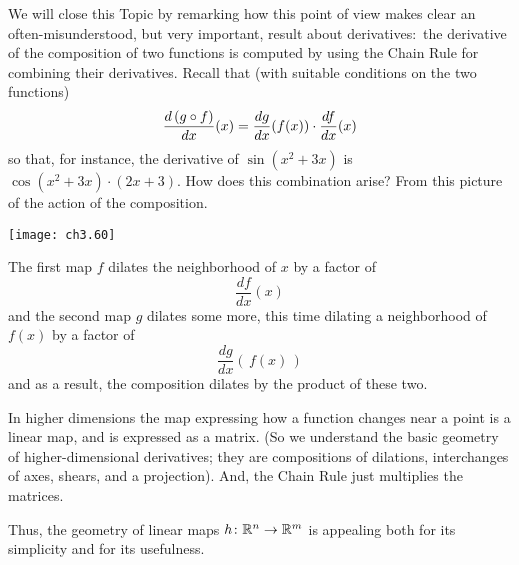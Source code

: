 We will close this Topic by remarking how
this point of view makes clear an often-misunderstood, but very important, 
result about derivatives:~the derivative of the composition of two functions
is computed by using the Chain Rule for combining their derivatives.
Recall that (with suitable conditions on the two functions)
\begin{equation*}
  \frac{d\,(g\mathbin\circ f)}{dx}(x) = 
  \frac{dg}{dx}(f(x))\cdot\frac{df}{dx}(x)
\end{equation*} 
so that, for instance, the derivative of $\sin(x^2+3x)$ is
$\cos(x^2+3x)\cdot(2x+3)$.
How does this combination arise?
From this picture of the action of the composition.  
\begin{center}
  \texttt{[image: ch3.60]}
\end{center}
The first map $f$ dilates the neighborhood of $x$ by a factor of 
\begin{equation*}
  \frac{df}{dx}(x) 
\end{equation*}
and the second map $g$ dilates some more, this time 
dilating a neighborhood of $f(x)$ by a factor of 
\begin{equation*}
  \frac{dg}{dx}(\,f(x)\,) 
\end{equation*}
and as a result, the composition dilates by the product of these two.

In higher dimensions 
the map expressing how a function changes near a point is a linear map,
and is expressed as a matrix.
(So we understand the basic geometry of higher-dimensional derivatives;
they are compositions of dilations, interchanges of axes, shears, and 
a projection).
And, the Chain Rule just multiplies the matrices.

Thus, the geometry of linear maps $\mbox{$h\colon \mathbb{R}^n\to \mathbb{R}^m$}$ 
is appealing both for its simplicity and for its usefulness.

